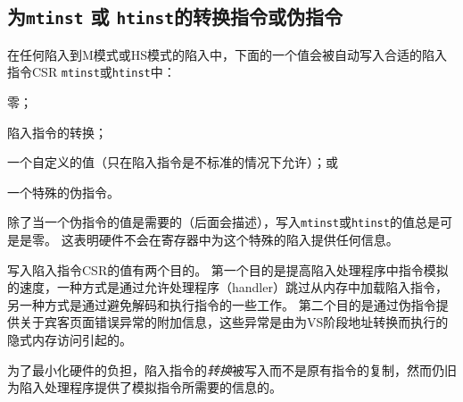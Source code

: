 \FloatBarrier

\subsection{为{\tt mtinst} 或 {\tt htinst}的转换指令或伪指令}
\label{sec:tinst-vals}

在任何陷入到M模式或HS模式的陷入中，下面的一个值会被自动写入合适的陷入指令CSR {\tt mtinst}或{\tt htinst}中：
\begin{tightlist}
\item
零；
\item
陷入指令的转换；
\item
一个自定义的值（只在陷入指令是不标准的情况下允许）；或
\item
一个特殊的伪指令。
\end{tightlist}
除了当一个伪指令的值是需要的（后面会描述），写入{\tt mtinst}或{\tt htinst}的值总是可是是零。
这表明硬件不会在寄存器中为这个特殊的陷入提供任何信息。

\begin{commentary}
  写入陷入指令CSR的值有两个目的。
  第一个目的是提高陷入处理程序中指令模拟的速度，一种方式是通过允许处理程序（handler）跳过从内存中加载陷入指令，另一种方式是通过避免解码和执行指令的一些工作。
  第二个目的是通过伪指令提供关于宾客页面错误异常的附加信息，这些异常是由为VS阶段地址转换而执行的隐式内存访问引起的。

为了最小化硬件的负担，陷入指令的\emph{转换}被写入而不是原有指令的复制，然而仍旧为陷入处理程序提供了模拟指令所需要的信息的。
\end{commentary}

